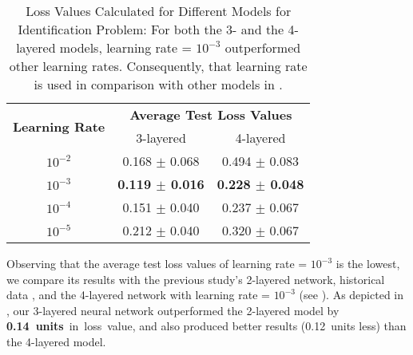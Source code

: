 \begin{table}[!htbp]
    \centering
    \caption[Loss Values Calculated for Different Models for Identification Problem]{Loss Values Calculated for Different Models for Identification Problem: For both the 3- and the 4-layered models, learning rate = $10^{-3}$ outperformed other learning rates. Consequently, that learning rate is used in comparison with other models in .}
    \label{tab:Loss Values Calculated for Different Models for Identification Problem}
    \begin{tabular}{c | c | c}
        \hline
        \multirow{2}{*}{\textbf{Learning Rate}} & \multicolumn{2}{c}{\textbf{Average Test Loss Values}} \\
        & 3-layered & 4-layered\\
        \hline
        $10^{-2}$ & 0.168 $\pm$ 0.068 & 0.494 $\pm$ 0.083\\
        $10^{-3}$ & \textbf{0.119 $\pm$ 0.016} & \textbf{0.228 $\pm$ 0.048}\\
        $10^{-4}$ & 0.151 $\pm$ 0.040 & 0.237 $\pm$ 0.067\\
        $10^{-5}$ & 0.212 $\pm$ 0.040 & 0.320 $\pm$ 0.067\\
        \hline
    \end{tabular}
\end{table}

Observing that the average test loss values of learning rate = $10^{-3}$ is the lowest, we compare its results with the previous study's 2-layered network, historical data \cite[Table~1]{Xue2016Avi2}, and the 4-layered network with learning rate = $10^{-3}$ (see ). As depicted in , our 3-layered neural network outperformed the 2-layered model by \textbf{0.14~units}~in~loss~value, and also produced better results (0.12~units less) than the 4-layered model.

